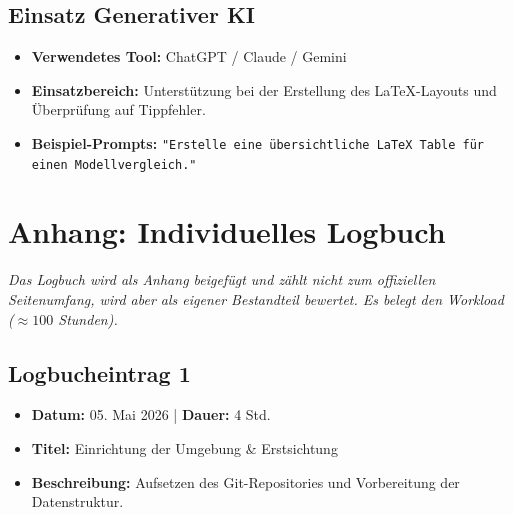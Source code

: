 \documentclass[11pt,a4paper]{article}
\begin{document}
\subsection{Einsatz Generativer KI}
\begin{itemize}
    \item \textbf{Verwendetes Tool:} ChatGPT / Claude / Gemini
    \item \textbf{Einsatzbereich:} Unterstützung bei der Erstellung des LaTeX-Layouts und Überprüfung auf Tippfehler.
    \item \textbf{Beispiel-Prompts:} \texttt{"Erstelle eine übersichtliche LaTeX Table für einen Modellvergleich."}
\end{itemize}

\newpage

\appendix
\section{Anhang: Individuelles Logbuch}
\label{sec:logbuch}

\textit{Das Logbuch wird als Anhang beigefügt und zählt nicht zum offiziellen Seitenumfang, wird aber als eigener Bestandteil bewertet. Es belegt den Workload ($\approx 100$ Stunden).}

\subsection*{Logbucheintrag 1}
\label{log:eintrag1}
\begin{itemize}[leftmargin=*]
    \item \textbf{Datum:} 05. Mai 2026 | \textbf{Dauer:} 4 Std.
    \item \textbf{Titel:} Einrichtung der Umgebung \& Erstsichtung
    \item \textbf{Beschreibung:} Aufsetzen des Git-Repositories und Vorbereitung der Datenstruktur.
\end{itemize}
\end{document}
